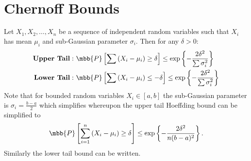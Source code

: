 \appendix
\section{Chernoff Bounds}

\begin{lemma}%
\label{Lem:Chernoff}
Let $X_1, X_2,\ldots, X_n$ be a sequence of independent random variables such that $X_i$ has mean $\mu_i$ and sub-Gaussian parameter $\sigma_i$. Then for any $\delta>0$:
\begin{align*}
\text{\textbf{Upper Tail}}: ~&\mbb{P}\left[\sum \left(X_i-\mu_i\right)\geq \delta\right]\leq \exp\left\lbrace-\frac{2\delta^2}{\sum \sigma_i^2}\right\rbrace\\
\textbf{Lower Tail}: ~&\mbb{P}\left[\sum \left(X_i-\mu_i\right)\leq -\delta\right]\leq \exp\left\lbrace-\frac{2\delta^2}{\sum \sigma_i^2}\right\rbrace
\end{align*}
Note that for bounded random variables $X_i\in [a,b]$ the sub-Gaussian parameter is $\sigma_i=\frac{b-a}{2}$ which simplifies whereupon the upper tail Hoeffding bound can be simplified to
\begin{align}
\mbb{P}\left[\sum_{i=1}^{n} \left(X_i-\mu_i\right)\geq \delta\right]\leq \exp\left\lbrace-\frac{2\delta^2}{n(b-a)^2}\right\rbrace.
\label{Eqn:HoeffdingBoundedRV}
\end{align}
Similarly the lower tail bound can be written.
\end{lemma}


